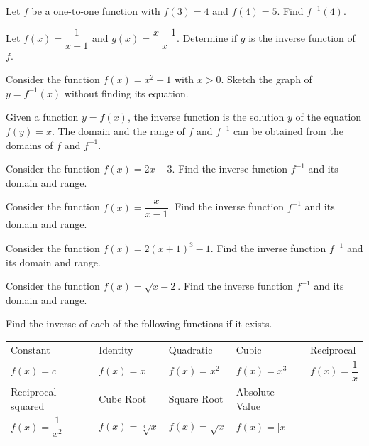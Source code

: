 \begin{example}
  Let $f$ be a one-to-one function with \(f(3)=4\) and \(f(4)=5\). Find $f^{-1}(4)$.
\end{example}

\begin{example}
  Let $f(x)=\dfrac{1}{x-1}$ and $g(x)=\dfrac{x+1}{x}$. Determine if $g$ is the inverse function of $f$.
\end{example}


\newpage

\begin{example}
  Consider the function $f(x)=x^2+1$ with $x>0$. Sketch the graph of $y=f^{-1}(x)$ without finding its equation.
\end{example}

\begin{howto}
  Given a function $y=f(x)$, the inverse function is the solution $y$ of the equation $f(y)=x$. The domain and the range of $f$ and $f^{-1}$ can be obtained from the domains of $f$ and $f^{-1}$.
\end{howto}


\begin{example}
  Consider the function $f(x)=2x-3$. Find the inverse function $f^{-1}$ and its domain and range.
\end{example}

\begin{example}
  Consider the function $f(x)=\dfrac{x}{x-1}$. Find the inverse function $f^{-1}$ and its domain and range.
\end{example}

\newpage

\begin{example}
  Consider the function $f(x)=2(x+1)^3-1$. Find the inverse function $f^{-1}$ and its domain and range.
\end{example}

\begin{example}
  Consider the function $f(x)=\sqrt{x-2}$. Find the inverse function $f^{-1}$ and its domain and range.
\end{example}

\begin{example} Find the inverse of each of the following functions if it exists.
  \begin{center}
    \begin{tabular}{*{5}{l}}
      \hline
    Constant & Identity & Quadratic & Cubic & Reciprocal\\
    $f(x)=c$ & $f(x)=x$ & $f(x)=x^2$ & $f(x)=x^3$ & $f(x)=\dfrac{1}{x}$\\
    \hline
    Reciprocal squared & Cube Root & Square Root & Absolute Value & \\
    $f(x)=\dfrac{1}{x^2}$ & $f(x)=\sqrt[3]{x}$ & $f(x)=\sqrt{x}$ & $f(x)=|x|$ & \\ 
      \hline
    \end{tabular}
  \end{center}
\end{example}

